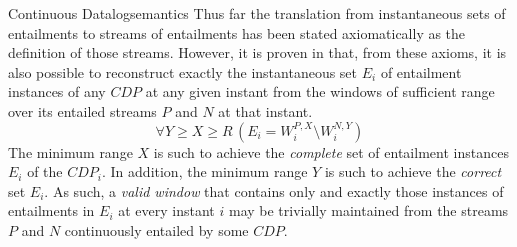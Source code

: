 \begin{nestedsection}{Continuous Datalog}{semantics}
	Thus far the translation from instantaneous sets of entailments to streams of entailments has been stated axiomatically as the definition of those streams.
	However, it is proven in  that, from these axioms, it is also possible to reconstruct exactly the instantaneous set $E_{i}$ of entailment instances of any ${CDP}$ at any given instant from the windows of sufficient range over its entailed streams $P$ and $N$ at that instant.
	\[ \forall Y \geq X \geq R \, \left( E_{i} = W^{P,X}_{i} \setminus W^{N,Y}_{i} \right) \]
	The minimum range $X$ is such to achieve the \emph{complete} set of entailment instances $E_{i}$ of the ${CDP}_{i}$.
	In addition, the minimum range $Y$ is such to achieve the \emph{correct} set $E_{i}$.
	As such, a \emph{valid window} that contains only and exactly those instances of entailments in $E_{i}$ at every instant $i$ may be trivially maintained from the streams $P$ and $N$ continuously entailed by some ${CDP}$.
\end{nestedsection}